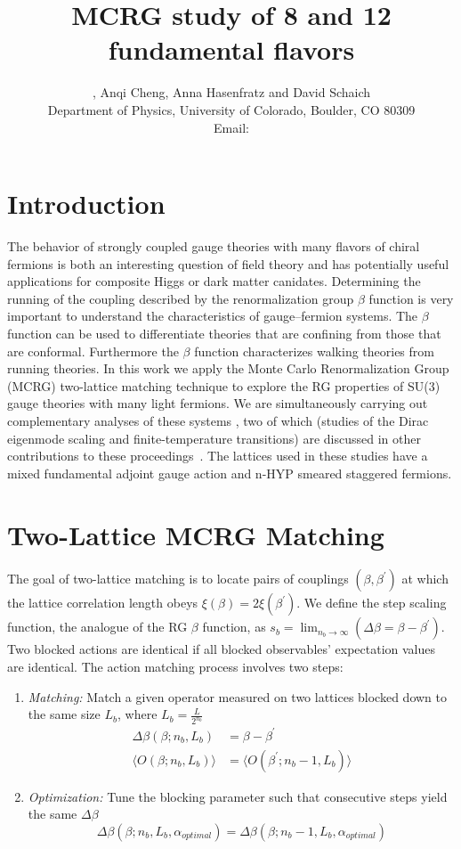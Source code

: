 \documentclass{PoS}
\title{MCRG study of 8 and 12 fundamental flavors}
\author{\speaker{Gregory Petropoulos}, Anqi Cheng, Anna Hasenfratz and David Schaich \\
  Department of Physics, University of Colorado, Boulder, CO 80309 \\
  Email: \email{gregory.petropoulos@colorado.edu}
}
\begin{document}
\section{Introduction}
The behavior of strongly coupled gauge theories with many flavors of chiral fermions is both an interesting question of field theory and has potentially useful applications for composite Higgs or dark matter canidates.
Determining the running of the coupling described by the renormalization group $\beta$ function is very important to understand the characteristics of gauge--fermion systems.
The $\beta$ function can be used to differentiate theories that are confining from those that are conformal.
Furthermore the $\beta$ function characterizes walking theories from running theories.
In this work we apply the Monte Carlo Renormalization Group (MCRG) two-lattice matching technique to explore the RG properties of SU(3) gauge theories with many light fermions.
We are simultaneously carrying out complementary analyses of these systems , two of which (studies of the Dirac eigenmode scaling and finite-temperature transitions) are discussed in other contributions to these proceedings~\cite{Hasenfratz:2012fp, Schaich:2012fr}.
The lattices used in these studies have a mixed fundamental adjoint gauge action and n-HYP smeared staggered fermions.

\section{\label{sec:MCRG}Two-Lattice MCRG Matching}
The goal of two-lattice matching is to locate pairs of couplings $(\beta, \beta^{\prime})$ at which the lattice correlation length obeys $\xi(\beta)=2\xi(\beta^{\prime})$.
We define the step scaling function, the analogue of the RG $\beta$ function, as $s_b= \lim_{n_b\to\infty}(\Delta\beta=\beta - \beta^{\prime})$.
Two blocked actions are identical if all blocked observables' expectation values are identical.
The action matching process involves two steps:
\begin{enumerate}
  \item \emph{Matching:} Match a given operator measured on two lattices blocked down to the same size $L_b$, where $L_b=\frac{L}{2^{n_b}}$
  \begin{align}
    \Delta\beta(\beta;n_b,L_b) & = \beta-\beta^{\prime} \\
    \langle O(\beta;n_b,L_b)\rangle & = \langle O(\beta^{\prime};n_b-1,L_b)\rangle
  \end{align}
  \item \emph{Optimization:} Tune the blocking parameter such that consecutive steps yield the same $\Delta\beta$
  \begin{equation}
    \Delta\beta(\beta;n_b,L_b,\alpha_{optimal})=\Delta\beta(\beta;n_b-1,L_b,\alpha_{optimal})
  \end{equation}
\end{enumerate}
\end{document}
